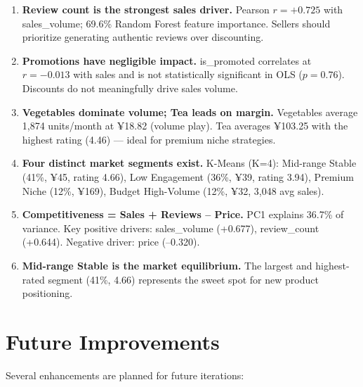 \documentclass[12pt,a4paper]{report}
\begin{document}
\begin{enumerate}[itemsep=4pt]
  \item \textbf{Review count is the strongest sales driver.} Pearson $r = +0.725$ with sales\_volume; 69.6\% Random Forest feature importance. Sellers should prioritize generating authentic reviews over discounting.
  \item \textbf{Promotions have negligible impact.} is\_promoted correlates at $r = -0.013$ with sales and is not statistically significant in OLS ($p = 0.76$). Discounts do not meaningfully drive sales volume.
  \item \textbf{Vegetables dominate volume; Tea leads on margin.} Vegetables average 1,874 units/month at ¥18.82 (volume play). Tea averages ¥103.25 with the highest rating (4.46) --- ideal for premium niche strategies.
  \item \textbf{Four distinct market segments exist.} K-Means (K=4): Mid-range Stable (41\%, ¥45, rating 4.66), Low Engagement (36\%, ¥39, rating 3.94), Premium Niche (12\%, ¥169), Budget High-Volume (12\%, ¥32, 3,048 avg sales).
  \item \textbf{Competitiveness = Sales + Reviews -- Price.} PC1 explains 36.7\% of variance. Key positive drivers: sales\_volume (+0.677), review\_count (+0.644). Negative driver: price (--0.320).
  \item \textbf{Mid-range Stable is the market equilibrium.} The largest and highest-rated segment (41\%, 4.66) represents the sweet spot for new product positioning.
\end{enumerate}

\section{Future Improvements}

Several enhancements are planned for future iterations:
\end{document}
